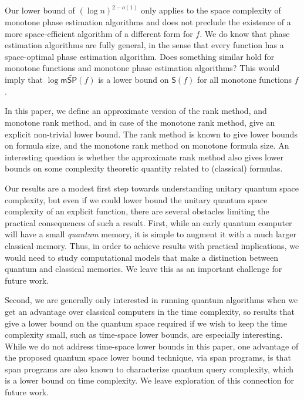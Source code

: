 \documentclass{toc}
\begin{document}
Our lower bound of $(\log n)^{2-o(1)}$ only applies to the space complexity of monotone phase estimation algorithms and does not preclude the existence of a more space-efficient algorithm of a different form for $f$. We do know that phase estimation algorithms are fully general, in the sense that every function has a space-optimal phase estimation algorithm. Does something similar hold for monotone functions and monotone phase estimation algorithms? This would imply that $\log\mathsf{m}\widetilde{\mathsf{SP}}(f)$ is a lower bound on $\mathsf{S}(f)$ for all monotone functions $f$. 

In this %
paper,  %
we define an approximate version of the rank method, and monotone rank method, and in case of the monotone rank method, give an explicit non-trivial lower bound. The rank method is known to give lower bounds on formula size, and the monotone rank method on monotone formula size. An interesting question is whether the approximate rank method also gives lower bounds on some complexity theoretic quantity related to (classical) formulas. 

Our results are a modest first step towards understanding unitary quantum space complexity, but even if we could lower bound the unitary quantum space complexity of an explicit function, there are several obstacles limiting the practical consequences of such a result. First, while an early quantum computer will have a small \emph{quantum} memory, it is simple to augment it with a much larger classical memory. Thus, in order to achieve results with practical implications, we would need to study computational models that make a distinction between quantum and classical memories. We leave this as an important challenge for future work. 

Second, we are generally only interested in running quantum algorithms when we get an advantage over classical computers in the time complexity, so results that give a lower bound on the quantum space required if we wish to keep the time complexity small, such as time-space lower bounds, are especially interesting. While we do not address time-space lower bounds in this paper, one advantage of the proposed quantum space lower bound technique, via span programs, is that span programs are also known to characterize quantum query complexity, which is a lower bound on time complexity. We leave exploration of this connection for future work. 
\end{document}

